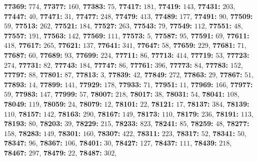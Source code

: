 \textsf{\bfseries 77369:} $774$, \textsf{\bfseries 77377:} $160$, \textsf{\bfseries 77383:} $75$, \textsf{\bfseries 77417:} $181$, \textsf{\bfseries 77419:} $143$, \textsf{\bfseries 77431:} $203$, \textsf{\bfseries 77447:} $40$, \textsf{\bfseries 77471:} $31$, \textsf{\bfseries 77477:} $248$, \textsf{\bfseries 77479:} $413$, \textsf{\bfseries 77489:} $177$, \textsf{\bfseries 77491:} $90$, \textsf{\bfseries 77509:} $59$, \textsf{\bfseries 77513:} $262$, \textsf{\bfseries 77521:} $184$, \textsf{\bfseries 77527:} $263$, \textsf{\bfseries 77543:} $79$, \textsf{\bfseries 77549:} $112$, \textsf{\bfseries 77551:} $48$, \textsf{\bfseries 77557:} $191$, \textsf{\bfseries 77563:} $142$, \textsf{\bfseries 77569:} $111$, \textsf{\bfseries 77573:} $5$, \textsf{\bfseries 77587:} $95$, \textsf{\bfseries 77591:} $69$, \textsf{\bfseries 77611:} $418$, \textsf{\bfseries 77617:} $265$, \textsf{\bfseries 77621:} $137$, \textsf{\bfseries 77641:} $341$, \textsf{\bfseries 77647:} $58$, \textsf{\bfseries 77659:} $229$, \textsf{\bfseries 77681:} $71$, \textsf{\bfseries 77687:} $60$, \textsf{\bfseries 77689:} $93$, \textsf{\bfseries 77699:} $224$, \textsf{\bfseries 77711:} $86$, \textsf{\bfseries 77713:} $414$, \textsf{\bfseries 77719:} $53$, \textsf{\bfseries 77723:} $274$, \textsf{\bfseries 77731:} $82$, \textsf{\bfseries 77743:} $184$, \textsf{\bfseries 77747:} $86$, \textsf{\bfseries 77761:} $396$, \textsf{\bfseries 77773:} $84$, \textsf{\bfseries 77783:} $152$, \textsf{\bfseries 77797:} $88$, \textsf{\bfseries 77801:} $87$, \textsf{\bfseries 77813:} $3$, \textsf{\bfseries 77839:} $42$, \textsf{\bfseries 77849:} $272$, \textsf{\bfseries 77863:} $29$, \textsf{\bfseries 77867:} $51$, \textsf{\bfseries 77893:} $14$, \textsf{\bfseries 77899:} $141$, \textsf{\bfseries 77929:} $178$, \textsf{\bfseries 77933:} $71$, \textsf{\bfseries 77951:} $11$, \textsf{\bfseries 77969:} $166$, \textsf{\bfseries 77977:} $59$, \textsf{\bfseries 77983:} $147$, \textsf{\bfseries 77999:} $57$, \textsf{\bfseries 78007:} $218$, \textsf{\bfseries 78017:} $38$, \textsf{\bfseries 78031:} $54$, \textsf{\bfseries 78041:} $108$, \textsf{\bfseries 78049:} $119$, \textsf{\bfseries 78059:} $24$, \textsf{\bfseries 78079:} $12$, \textsf{\bfseries 78101:} $22$, \textsf{\bfseries 78121:} $17$, \textsf{\bfseries 78137:} $384$, \textsf{\bfseries 78139:} $110$, \textsf{\bfseries 78157:} $142$, \textsf{\bfseries 78163:} $290$, \textsf{\bfseries 78167:} $149$, \textsf{\bfseries 78173:} $110$, \textsf{\bfseries 78179:} $236$, \textsf{\bfseries 78191:} $113$, \textsf{\bfseries 78193:} $80$, \textsf{\bfseries 78203:} $39$, \textsf{\bfseries 78229:} $215$, \textsf{\bfseries 78233:} $823$, \textsf{\bfseries 78241:} $85$, \textsf{\bfseries 78259:} $48$, \textsf{\bfseries 78277:} $158$, \textsf{\bfseries 78283:} $149$, \textsf{\bfseries 78301:} $160$, \textsf{\bfseries 78307:} $422$, \textsf{\bfseries 78311:} $223$, \textsf{\bfseries 78317:} $52$, \textsf{\bfseries 78341:} $50$, \textsf{\bfseries 78347:} $96$, \textsf{\bfseries 78367:} $106$, \textsf{\bfseries 78401:} $30$, \textsf{\bfseries 78427:} $127$, \textsf{\bfseries 78437:} $111$, \textsf{\bfseries 78439:} $218$, \textsf{\bfseries 78467:} $297$, \textsf{\bfseries 78479:} $22$, \textsf{\bfseries 78487:} $302$, 
